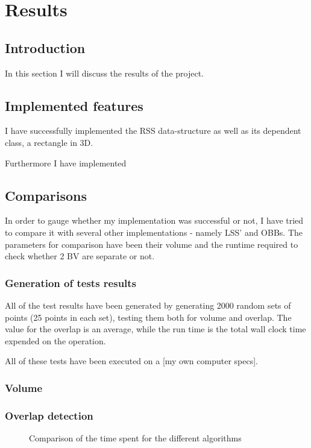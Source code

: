 
\section{Results}
\label{results}
\subsection{Introduction}
In this section I will discuss the results of the project.

\subsection{Implemented features}
I have successfully implemented the RSS data-structure as well as its dependent class, a rectangle in 3D. 

Furthermore I have implemented

\subsection{Comparisons}

In order to gauge whether my implementation was successful or not, I have tried to compare it with several other implementations - namely LSS' and OBBs. The parameters for comparison have been their volume and the runtime required to check whether 2 BV are separate or not.

\subsubsection{Generation of tests results}
All of the test results have been generated by generating 2000 random sets of points (25 points in each set), testing them both for volume and overlap. The value for the overlap is an average, while the run time is the total wall clock time expended on the operation.

All of these tests have been executed on a [my own computer specs].

\subsubsection{Volume}


\subsubsection{Overlap detection}

\begin{figure}
\caption{\label{overlap-OBB_RSS_RSS2_LSS}Comparison of the time spent for the different algorithms}
\end{figure}

